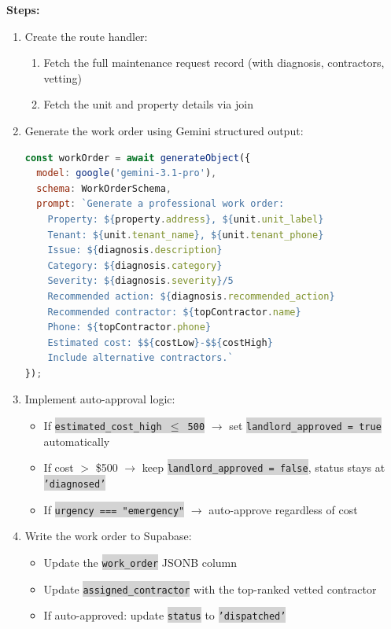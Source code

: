 \documentclass[11pt, a4paper]{article}
\newcommand{\code}[1]{\texttt{\small\colorbox{lightgray}{#1}}}
\begin{document}
\textbf{Steps:}
\begin{enumerate}[leftmargin=2em, itemsep=2pt]
  \item Create the route handler:
    \begin{enumerate}[itemsep=1pt]
      \item Fetch the full maintenance request record (with diagnosis, contractors, vetting)
      \item Fetch the unit and property details via join
    \end{enumerate}

  \item Generate the work order using Gemini structured output:
\begin{lstlisting}[language=JavaScript]
const workOrder = await generateObject({
  model: google('gemini-3.1-pro'),
  schema: WorkOrderSchema,
  prompt: `Generate a professional work order:
    Property: ${property.address}, ${unit.unit_label}
    Tenant: ${unit.tenant_name}, ${unit.tenant_phone}
    Issue: ${diagnosis.description}
    Category: ${diagnosis.category}
    Severity: ${diagnosis.severity}/5
    Recommended action: ${diagnosis.recommended_action}
    Recommended contractor: ${topContractor.name}
    Phone: ${topContractor.phone}
    Estimated cost: $${costLow}-$${costHigh}
    Include alternative contractors.`
});
\end{lstlisting}

  \item Implement auto-approval logic:
    \begin{itemize}[itemsep=1pt]
      \item If \code{estimated\_cost\_high $\leq$ 500} $\rightarrow$ set \code{landlord\_approved = true} automatically
      \item If cost $>$ \$500 $\rightarrow$ keep \code{landlord\_approved = false}, status stays at \code{'diagnosed'}
      \item If \code{urgency === "emergency"} $\rightarrow$ auto-approve regardless of cost
    \end{itemize}

  \item Write the work order to Supabase:
    \begin{itemize}[itemsep=1pt]
      \item Update the \code{work\_order} JSONB column
      \item Update \code{assigned\_contractor} with the top-ranked vetted contractor
      \item If auto-approved: update \code{status} to \code{'dispatched'}
    \end{itemize}
\end{enumerate}
\end{document}
